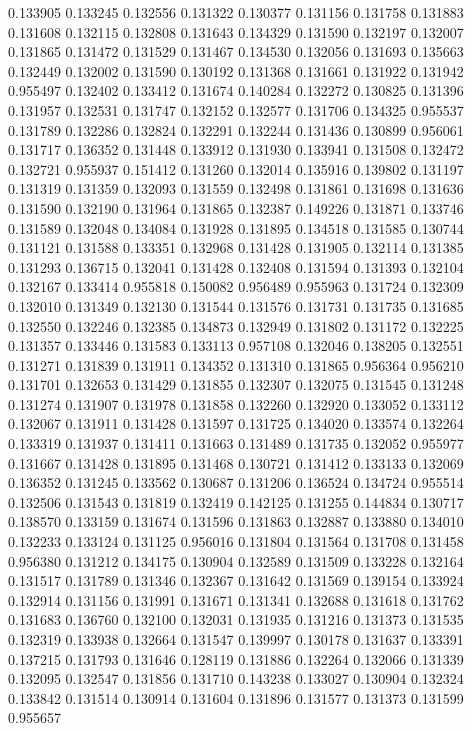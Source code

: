 0.133905
0.133245
0.132556
0.131322
0.130377
0.131156
0.131758
0.131883
0.131608
0.132115
0.132808
0.131643
0.134329
0.131590
0.132197
0.132007
0.131865
0.131472
0.131529
0.131467
0.134530
0.132056
0.131693
0.135663
0.132449
0.132002
0.131590
0.130192
0.131368
0.131661
0.131922
0.131942
0.955497
0.132402
0.133412
0.131674
0.140284
0.132272
0.130825
0.131396
0.131957
0.132531
0.131747
0.132152
0.132577
0.131706
0.134325
0.955537
0.131789
0.132286
0.132824
0.132291
0.132244
0.131436
0.130899
0.956061
0.131717
0.136352
0.131448
0.133912
0.131930
0.133941
0.131508
0.132472
0.132721
0.955937
0.151412
0.131260
0.132014
0.135916
0.139802
0.131197
0.131319
0.131359
0.132093
0.131559
0.132498
0.131861
0.131698
0.131636
0.131590
0.132190
0.131964
0.131865
0.132387
0.149226
0.131871
0.133746
0.131589
0.132048
0.134084
0.131928
0.131895
0.134518
0.131585
0.130744
0.131121
0.131588
0.133351
0.132968
0.131428
0.131905
0.132114
0.131385
0.131293
0.136715
0.132041
0.131428
0.132408
0.131594
0.131393
0.132104
0.132167
0.133414
0.955818
0.150082
0.956489
0.955963
0.131724
0.132309
0.132010
0.131349
0.132130
0.131544
0.131576
0.131731
0.131735
0.131685
0.132550
0.132246
0.132385
0.134873
0.132949
0.131802
0.131172
0.132225
0.131357
0.133446
0.131583
0.133113
0.957108
0.132046
0.138205
0.132551
0.131271
0.131839
0.131911
0.134352
0.131310
0.131865
0.956364
0.956210
0.131701
0.132653
0.131429
0.131855
0.132307
0.132075
0.131545
0.131248
0.131274
0.131907
0.131978
0.131858
0.132260
0.132920
0.133052
0.133112
0.132067
0.131911
0.131428
0.131597
0.131725
0.134020
0.133574
0.132264
0.133319
0.131937
0.131411
0.131663
0.131489
0.131735
0.132052
0.955977
0.131667
0.131428
0.131895
0.131468
0.130721
0.131412
0.133133
0.132069
0.136352
0.131245
0.133562
0.130687
0.131206
0.136524
0.134724
0.955514
0.132506
0.131543
0.131819
0.132419
0.142125
0.131255
0.144834
0.130717
0.138570
0.133159
0.131674
0.131596
0.131863
0.132887
0.133880
0.134010
0.132233
0.133124
0.131125
0.956016
0.131804
0.131564
0.131708
0.131458
0.956380
0.131212
0.134175
0.130904
0.132589
0.131509
0.133228
0.132164
0.131517
0.131789
0.131346
0.132367
0.131642
0.131569
0.139154
0.133924
0.132914
0.131156
0.131991
0.131671
0.131341
0.132688
0.131618
0.131762
0.131683
0.136760
0.132100
0.132031
0.131935
0.131216
0.131373
0.131535
0.132319
0.133938
0.132664
0.131547
0.139997
0.130178
0.131637
0.133391
0.137215
0.131793
0.131646
0.128119
0.131886
0.132264
0.132066
0.131339
0.132095
0.132547
0.131856
0.131710
0.143238
0.133027
0.130904
0.132324
0.133842
0.131514
0.130914
0.131604
0.131896
0.131577
0.131373
0.131599
0.955657
